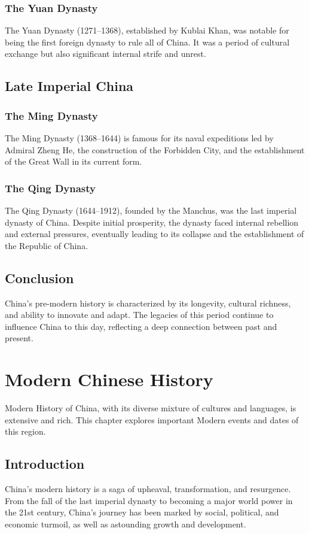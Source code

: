 \documentclass[a4paper,12pt]{book}
\begin{document}
\subsection{The Yuan Dynasty}
The Yuan Dynasty (1271–1368), established by Kublai Khan, was notable for being the first foreign dynasty to rule all of China. It was a period of cultural exchange but also significant internal strife and unrest.

\section{Late Imperial China}
\subsection{The Ming Dynasty}
The Ming Dynasty (1368–1644) is famous for its naval expeditions led by Admiral Zheng He, the construction of the Forbidden City, and the establishment of the Great Wall in its current form.

\subsection{The Qing Dynasty}
The Qing Dynasty (1644–1912), founded by the Manchus, was the last imperial dynasty of China. Despite initial prosperity, the dynasty faced internal rebellion and external pressures, eventually leading to its collapse and the establishment of the Republic of China.

\section{Conclusion}
China's pre-modern history is characterized by its longevity, cultural richness, and ability to innovate and adapt. The legacies of this period continue to influence China to this day, reflecting a deep connection between past and present.

\chapter{Modern Chinese History}
\label{ch:modern-chinese-history}

Modern History of China, with its diverse mixture of cultures and languages, is extensive and rich. This chapter explores important Modern events and dates of this region.

\section{Introduction}
\label{sec:introduction}
China's modern history is a saga of upheaval, transformation, and resurgence. From the fall of the last imperial dynasty to becoming a major world power in the 21st century, China's journey has been marked by social, political, and economic turmoil, as well as astounding growth and development.
\end{document}

